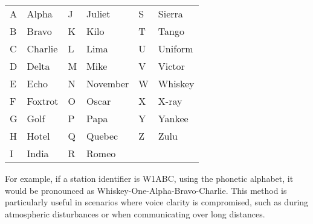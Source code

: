 \begin{center}
\begin{tcolorbox}[title=NATO Phonetic Alphabet,colback=white]
\begin{tabular}{|l|l||l|l||l|l|}
\hline
A & Alpha    & J & Juliet    & S & Sierra    \\
B & Bravo    & K & Kilo      & T & Tango     \\
C & Charlie  & L & Lima      & U & Uniform   \\
D & Delta    & M & Mike      & V & Victor    \\
E & Echo     & N & November  & W & Whiskey   \\
F & Foxtrot  & O & Oscar     & X & X-ray     \\
G & Golf     & P & Papa      & Y & Yankee    \\
H & Hotel    & Q & Quebec    & Z & Zulu      \\
I & India    & R & Romeo     &   &           \\
\hline
\end{tabular}
\end{tcolorbox}
\end{center}

For example, if a station identifier is W1ABC, using the phonetic alphabet, it would be pronounced as Whiskey-One-Alpha-Bravo-Charlie. This method is particularly useful in scenarios where voice clarity is compromised, such as during atmospheric disturbances or when communicating over long distances.



